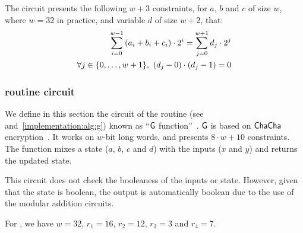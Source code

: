 The circuit presents the following $w+3$ constraints, for $a$, $b$ and $c$ of size $w$, where $w=32$ in practice, and variable $d$ of size $w+2$, that:
\begin{align}
  \sum_{i=0}^{w - 1} \left( a_i + b_i + c_i \right ) \cdot 2^i = \sum_{j=0}^{w+1} d_j \cdot 2^j \label{implementation:eq:triple_modular_sum} \\
  \forall j \in \{{0},\ldots,{w + 1}\},\ (d_j - 0) \cdot (d_j - 1) = 0 \label{implementation:eq:triple_modular_bool}
\end{align}

\subsubsection{ routine circuit}\label{implementation:efficiency:blake:g-circuit}

We define in this section the circuit of the  routine (see~\cite[Section 3.1]{blakecompietf} and~\cref{implementation:alg:g}) known as ``$\mathsf{G}$ function''~\cite[Section 2.4]{aumasson2013blake2}. $\mathsf{G}$ is based on $\mathsf{ChaCha}$ encryption~\cite{bernstein2008chacha}. It works on $w$-bit long words, and presents $8 \cdot w+10$ constraints. The function mixes a state ($a$, $b$, $c$ and $d$) with the inputs ($x$ and $y$) and returns the updated state.

This circuit does not check the booleaness of the inputs or state. However, given that the state is boolean, the output is automatically boolean due to the use of the modular addition circuits.

For , we have $w=32$, $r_1=16$, $r_2 = 12$, $r_3=3$ and $r_4=7$.

